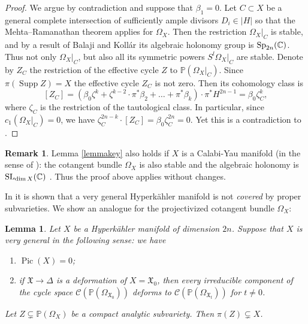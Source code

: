 \documentclass[11pt]{article}
\let\mathcal\mathscr
\theoremstyle{plain}
\newtheorem{lemma}[theorem]{Lemma}
\theoremstyle{definition}
\newtheorem{remark}[theorem]{Remark}
\newcommand{\PP}{\ensuremath{\mathbb{P}}}
\newcommand{\chow}[1]{\ensuremath{\mathcal{C}(#1)}}
\DeclareMathOperator{\pic}{Pic}
\DeclareMathOperator{\supp}{Supp}
\begin{document}
\begin{proof}
We argue by contradiction and suppose that $\beta_1=0$. Let $C \subset X$ be a general complete intersection
of sufficiently ample divisors $D_i \in | H |$ so that the Mehta--Ramanathan theorem \cite[Th.\,4.3]{MR84} applies for $\Omega_X$. Then the restriction $\Omega_X|_C$ is stable, and by a result of Balaji and Kollár \cite[Prop.\,10]{BK08}
its algebraic holonomy group is $\mbox{Sp}_{2n}(\mathbb{C})$. Thus not only $\Omega_X|_C$, but also all its symmetric
powers $S^l \Omega_X|_C$ are stable. Denote by $Z_C$ the restriction of the effective cycle $Z$
to $\PP(\Omega_X|_C)$.
Since $\pi(\supp Z) = X$ the effective cycle $Z_C$ is not zero.
Then its cohomology class is
\[
[Z_C]= (\beta_0 \zeta^k + \zeta^{k-2}\cdot \pi^* \beta_2 + \ldots + \pi^* \beta_k) \cdot \pi^* H^{2n-1}
= \beta_0 \zeta_C^k,
\]
where $\zeta_C$ is the restriction of the tautological class. In particular, since $c_1(\Omega_X|_C)=0$, we
have $\zeta_C^{2n-k} \cdot [Z_C] = \beta_0 \zeta_C^{2n} = 0$. Yet this is a contradiction to \cite[Prop.\,1.3]{HP19}.
\end{proof}

\begin{remark}
Lemma \ref{lemmakey} also holds if $X$ is a Calabi-Yau manifold (in the sense of \cite{Bea83}): the cotangent bundle
$\Omega_X$ is also stable and the algebraic holonomy is $\mathrm{SL}_{\dim X}(\mathbb{C})$ \cite[Prop.\,10]{BK08}.
Thus the proof above applies without changes.
\end{remark}

In \cite[Cor.\,2.6]{COP10} it is shown that a very general Hyperkähler manifold is not {\em covered} by proper subvarieties. We show an analogue for the projectivized cotangent bundle $\Omega_X$:

\begin{lemma}\label{lemmanosubvariety}
Let $X$ be a Hyperkähler manifold of dimension $2n$. Suppose that $X$ is very general in the following sense:
we have
\begin{enumerate}
\item $\pic (X)=0$;
\item if $\mathfrak X \to \Delta$ is a deformation of $X=\mathfrak X_0$, then every irreducible component of the
cycle space $\chow{\PP(\Omega_{\mathfrak X_0})}$ deforms to $\chow{\PP(\Omega_{\mathfrak X_t})}$
for $t \neq 0$.
\end{enumerate}
Let $Z \subsetneq \PP(\Omega_X)$ be a compact analytic subvariety.
Then $\pi(Z) \subsetneq X$.
\end{lemma}
\end{document}
